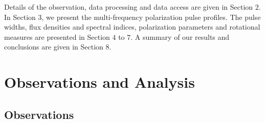 \documentclass[useAMS,usenatbib]{mn2e}
\begin{document}
Details of the observation, data processing and data access are given in 
Section $2$. 
%
In Section $3$, we present the multi-frequency polarization pulse profiles.
%
The pulse widths, flux densities and spectral indices, polarization parameters 
and rotational measures are presented in Section $4$ to $7$. 
%
A summary of our results and conclusions are given in Section $8$.


\section{Observations and Analysis}

\subsection{Observations}
\end{document}
